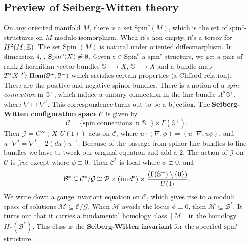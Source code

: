 \subsection{Preview of Seiberg-Witten theory}
On any oriented manifold $M$, there is a set $\mathrm{Spin}^c(M)$, which is the set of  $\mathrm{spin}^c$-structures on $M$ modulo isomorphism. When it's non-empty, it's a torsor for $H^2(M;\mathbb{Z})$. The set $\mathrm{Spin}^c (M)$ is natural under oriented diffeomorphism. In dimension 4, , $\mathrm{Sp in}^c (X)\neq \emptyset$. Given $\mathfrak s \in \mathrm{Sp in}^c$ a $\mathrm{sp in}^c$-structure, we get a pair of rank 2 hermitian vector bundles $\mathbb S^+ \to X$, $\mathbb S^- \to X$ and a bundle map $T^*X \xrightarrow{\rho} \operatorname{Hom}(\mathbb S^+, \mathbb S^-)$ which satisfies certain properties (a Clifford relation). These are the positive and negative spinor bundles. 
There is a notion of a \emph{spin connection} in $\mathbb S^+$, which induce a unitary connection in the line bundle $\Lambda^2 \mathbb S^+$, where $\nabla \mapsto  \nabla^t$. This correspondence turns out to be a bijection. The \textbf{Seiberg-Witten configuration space} $\mathcal C$ is given by \[
    \mathcal C = \{ \text{spin connections in } \mathbb S^+\} \times  \Gamma (\mathbb S^+).
\] Then $\mathcal G = C ^{\infty}(X, U(1))$ acts on $\mathcal C$, where $u\cdot (\nabla, \phi) = (u \cdot \nabla, u\phi)$, and $u \cdot \nabla^t = \nabla^t - 2(du) u^{-1}$. Because of the passage from spinor line bundles to line bundles we have to tweak our original equation and add a 2. The action of $\mathcal G$ on $\mathcal C$ is \emph{free} except where $\phi \equiv 0$. Then $\mathcal C^*$ is local where $\phi \not \equiv 0$, and  \[
\mathcal B^* \subseteq \mathcal C^* / \mathcal G \cong  \mathcal P \times (\operatorname{im} d^*) \times \frac{\left( \Gamma(\mathbb S^+) \setminus \{0\}  \right) }{U(1)}.
\] We write down a gauge invariant equation on $\mathcal C$, which gives rise to a moduli space of solutions $\mathcal M\subseteq  \mathcal C / \mathcal G$. When $\mathcal M$ avoids the locus $\phi \equiv 0$, then $\mathcal M \subseteq \mathcal B^*$. It turns out that it carries a fundamental homology class $[\mathcal M]$ in  the homology $H_*(\mathcal B^*)$. This class is the \textbf{Seiberg-Witten invariant} for the specified $\mathrm{sp in}^c$-structure.




